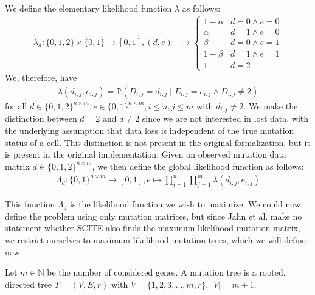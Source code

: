 \begin{definition}
    \label{def:likelihood}
    We define the elementary likelihood function $\lambda$ as follows:
    \begin{align*}
        \lambda_d: \{0, 1, 2\} \times \{0, 1\} \rightarrow [0, 1], (d, e) &\mapsto \begin{cases}
            1-\alpha & d = 0 \wedge e = 0 \\
            \alpha & d = 1 \wedge e = 0 \\
            \beta & d = 0 \wedge e = 1 \\
            1-\beta & d = 1 \wedge e = 1 \\
            1 & d = 2
        \end{cases}
    \end{align*}
    We, therefore, have 
    \begin{align*}
        \lambda(d_{i,j}, e_{i,j}) = \mathbb{P}(D_{i,j} = d_{i,j} \mid E_{i,j} = e_{i,j} \wedge D_{i,j} \neq 2)
    \end{align*}
    for all $d \in \{0,1,2\}^{n \times m}, e \in \{0,1\}^{n \times m}, i \leq n, j \leq m$ with $d_{i,j} \neq 2$. We make the distinction between $d = 2$ and $d \neq 2$ since we are not interested in lost data, with the underlying assumption that data loss is independent of the true mutation status of a cell. This distinction is not present in the original formalization, but it is present in the original implementation. Given an observed mutation data matrix $d \in \{0,1,2\}^{n \times m}$, we then define the global likelihood function as follows:
    \begin{align*}
        \Lambda_d : \{0,1\}^{n \times m} \rightarrow [0,1], e \mapsto \prod_{i = 1}^{n} \prod_{j = 1}^{m} \lambda(d_{i,j}, e_{i,j})
    \end{align*}
\end{definition}

This function $\Lambda_d$ is the likelihood function we wish to maximize. We could now define the problem using only mutation matrices, but since Jahn et al. make no statement whether \ac{SCITE} also finds the maximum-likelihood mutation matrix, we restrict ourselves to maximum-likelihood mutation trees, which we will define now:

\begin{definition}
    \label{def:mutation_tree}
    Let $m \in \mathbb{N}$ be the number of considered genes. A mutation tree is a rooted, directed tree $T = (V, E, r)$ with $V = \{1, 2, 3, \dots, m, r\}$, $|V| = m+1$.
\end{definition}

